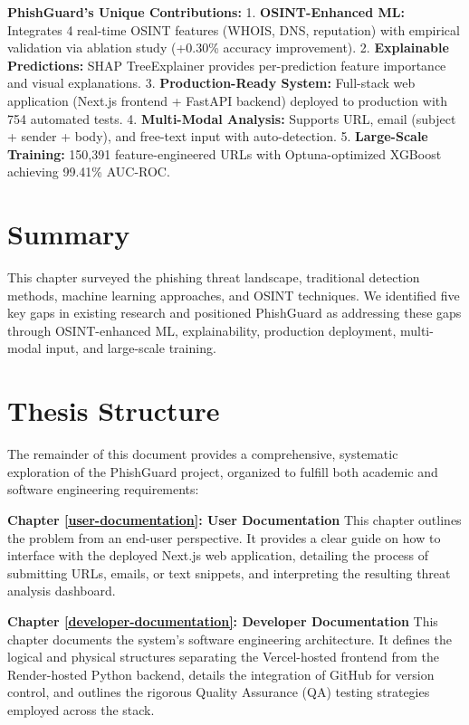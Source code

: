 \textbf{PhishGuard's Unique Contributions:} 1. \textbf{OSINT-Enhanced
ML:} Integrates 4 real-time OSINT features (WHOIS, DNS, reputation) with
empirical validation via ablation study (+0.30\% accuracy improvement).
2. \textbf{Explainable Predictions:} SHAP TreeExplainer provides
per-prediction feature importance and visual explanations. 3.
\textbf{Production-Ready System:} Full-stack web application (Next.js
frontend + FastAPI backend) deployed to production with 754 automated
tests. 4. \textbf{Multi-Modal Analysis:} Supports URL, email (subject +
sender + body), and free-text input with auto-detection. 5.
\textbf{Large-Scale Training:} 150,391 feature-engineered URLs with
Optuna-optimized XGBoost achieving 99.41\% AUC-ROC.

\section{Summary}\label{summary}

This chapter surveyed the phishing threat landscape,
traditional detection methods, machine learning approaches, and OSINT techniques. We identified five
key gaps in existing research and positioned PhishGuard
as addressing these gaps through OSINT-enhanced ML, explainability,
production deployment, multi-modal input, and large-scale training.

\section{Thesis Structure}\label{thesis-structure}

The remainder of this document provides a comprehensive, systematic exploration of the PhishGuard project, organized to fulfill both academic and software engineering requirements:

\textbf{Chapter \ref{user-documentation}: User Documentation} This chapter outlines the problem from an end-user perspective. It provides a clear guide on how to interface with the deployed Next.js web application, detailing the process of submitting URLs, emails, or text snippets, and interpreting the resulting threat analysis dashboard.

\textbf{Chapter \ref{developer-documentation}: Developer Documentation} This chapter documents the system's software engineering architecture. It defines the logical and physical structures separating the Vercel-hosted frontend from the Render-hosted Python backend, details the integration of GitHub for version control, and outlines the rigorous Quality Assurance (QA) testing strategies employed across the stack.

